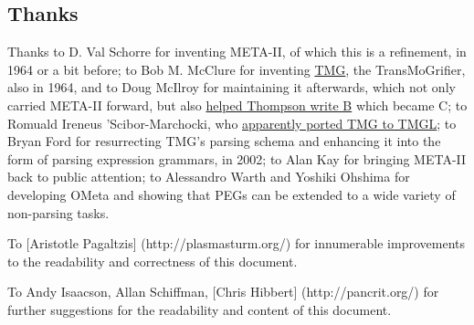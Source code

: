 \documentclass[
]{article}
\begin{document}
\hypertarget{thanks}{%
\subsection{Thanks}\label{thanks}}

Thanks to D. Val Schorre for inventing META-II, of which this is a
refinement, in 1964 or a bit before; to Bob M. McClure for inventing
\href{http://www.multicians.org/tmg.html}{TMG}, the TransMoGrifier, also
in 1964, and to Doug McIlroy for maintaining it afterwards, which not
only carried META-II forward, but also
\href{http://plan9.bell-labs.com/who/dmr/chist.html}{helped Thompson
write B} which became C; to Romuald Ireneus 'Scibor-Marchocki, who
\href{http://www.geocities.com/ResearchTriangle/2363/tmg011.html}{apparently
ported TMG to TMGL}; to Bryan Ford for resurrecting TMG's parsing schema
and enhancing it into the form of parsing expression grammars, in 2002;
to Alan Kay for bringing META-II back to public attention; to Alessandro
Warth and Yoshiki Ohshima for developing OMeta and showing that PEGs can
be extended to a wide variety of non-parsing tasks.

To {[}Aristotle Pagaltzis{]} (http://plasmasturm.org/) for innumerable
improvements to the readability and correctness of this document.

To Andy Isaacson, Allan Schiffman, {[}Chris Hibbert{]}
(http://pancrit.org/) for further suggestions for the readability and
content of this document.
\end{document}
